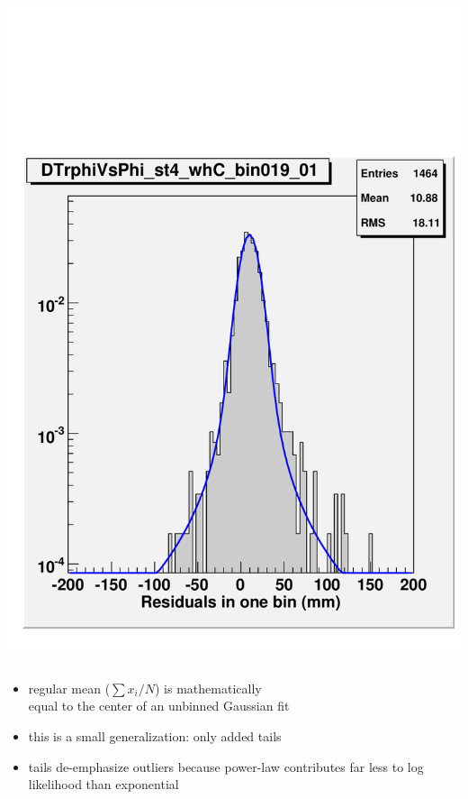 \documentclass[compress]{beamer}
\begin{document}
\begin{frame}
\begin{columns}
\includegraphics[width=\linewidth]{fitfunction.pdf}
\end{columns}

\begin{itemize}
\item regular mean ($\sum x_i/N$) is mathematically \\ equal to the center of an unbinned Gaussian fit
\item this is a small generalization: only added tails
\item tails de-emphasize outliers because power-law contributes far less to log likelihood than exponential
\end{itemize}
\end{frame}
\end{document}
